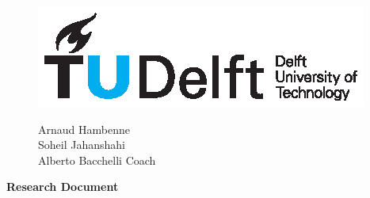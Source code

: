 \documentclass[12pt]{article}
\begin{document}
\thispagestyle{fancy}
\begin{figure}
    \begin{minipage}[H]{0.33\textwidth}
		\vspace{0.3cm}
		\includegraphics[scale=0.8]{img/TUDelftLogo.eps}
	\end{minipage}
	\begin{minipage}[H]{0.34\textwidth}
		\begin{center}
			\selectfont \textcolor{blue}{}
		\end{center}
		
	
	\end{minipage}
	\begin{minipage}[H]{0.33\textwidth}
			\begin{flushright}

				\small{Arnaud Hambenne }\\
				\small{Soheil Jahanshahi }\\
				\vspace{5mm}
				\small{Alberto Bacchelli \qquad Coach~~~}
				

			\end{flushright}
			
	\end{minipage}
\end{figure}


\begin{minipage}[H]{\textwidth}
\vspace{0.3cm}
		\begin{center}
		
		\vspace{0.3cm}
			\Large{\selectfont \textbf{Research Document}}\\
		\vspace{0.3cm}	
		
		\vspace{0.7cm}	
		\end{center}
	\end{minipage}
\end{document}
